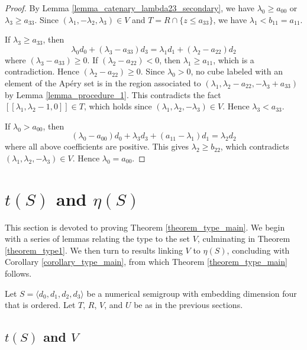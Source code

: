 \documentclass[12pt]{article}
\theoremstyle{remark}
\begin{document}
\begin{proof}
By Lemma \ref{lemma_catenary_lambda23_secondary}, we have $\lambda_0 \geq a_{00}$ or $\lambda_3 \geq a_{33}$.  Since $(\lambda_1,-\lambda_2,\lambda_3) \in V$ and $T = R \cap \{z \leq a_{33}\}$, we have $\lambda_1 < b_{11} = a_{11}$.

If $\lambda_3\geq a_{33}$, then
\begin{equation}
     \lambda_0d_0   + (\lambda_3-a_{33})d_3=  \lambda_1d_1 + (\lambda_2-a_{22})d_2 
\end{equation}
where $(\lambda_3-a_{33}) \geq 0$.
If $(\lambda_2-a_{22}) < 0$, then $\lambda_1 \geq a_{11}$, which is a contradiction. Hence $(\lambda_2-a_{22}) \geq 0$. Since $\lambda_0 > 0$, no cube labeled with an element of the Ap{\'e}ry set is in the region associated to $(\lambda_1,\lambda_2-a_{22},-\lambda_3+a_{33})$ by Lemma \ref{lemma_procedure_1}. This contradicts the fact $[[\lambda_1,\lambda_2-1,0]] \in T$, which holds since $(\lambda_1,\lambda_2,-\lambda_3) \in V$. Hence $\lambda_3 < a_{33}$.

If $\lambda_0 > a_{00}$, then
\begin{equation}
     (\lambda_0-a_{00})d_0 + \lambda_3d_3 + (a_{11}-\lambda_1)d_1 =  \lambda_2d_2
\end{equation}
where all above coefficients are positive. This gives $\lambda_2 \geq b_{22}$, which contradicts $(\lambda_1,\lambda_2,-\lambda_3) \in V$. Hence $\lambda_0 = a_{00}$.
\end{proof}







\section{$t(S)$ and $\eta(S)$ }\label{section_type}


This section is devoted to proving Theorem \ref{theorem_type_main}. We begin with a series of lemmas relating the type to the set $V$, culminating in Theorem \ref{theorem_type1}. We then turn to results linking $V$ to $\eta(S)$, concluding with Corollary \ref{corollary_type_main}, from which Theorem \ref{theorem_type_main} follows.

Let $S = \langle d_0,d_1,d_2,d_3 \rangle$ be a numerical semigroup with embedding dimension four that is ordered. Let $T$, $R$, $V$, and $U$ be as in the previous sections.


\subsection{$t(S)$ and $V$}
\end{document}
